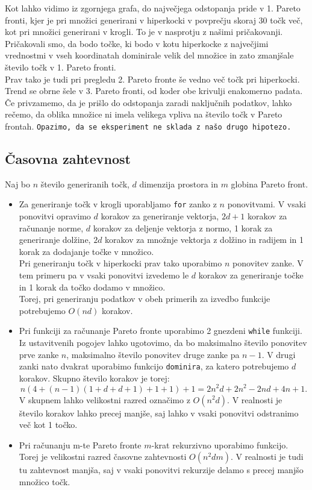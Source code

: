 \documentclass{article}
\begin{document}
Kot lahko vidimo iz zgornjega grafa, do največjega odstopanja pride v 1. Pareto fronti, kjer je pri množici generirani v hiperkocki v povprečju skoraj 30 točk več, kot pri množici generirani v krogli. To je v nasprotju z našimi pričakovanji. Pričakovali smo, da bodo točke, ki bodo v kotu hiperkocke z največjimi vrednostmi v vseh koordinatah dominirale velik del množice in zato zmanjšale število točk v 1. Pareto fronti. \\
Prav tako je tudi pri pregledu 2. Pareto fronte še vedno več točk pri hiperkocki. Trend se obrne šele v 3. Pareto fronti, od koder obe krivulji enakomerno padata. \\
Če privzamemo, da je prišlo do odstopanja zaradi naključnih podatkov, lahko rečemo, da oblika množice ni imela velikega vpliva na število točk v Pareto frontah.
\texttt{Opazimo, da se eksperiment ne sklada z našo drugo hipotezo.}

\subsection{Časovna zahtevnost}
Naj bo $n$ število generiranih točk, $d$ dimenzija prostora in $m$ globina Pareto front. 
\begin{itemize}
    \item Za generiranje točk v krogli uporabljamo \texttt{for} zanko z $n$ ponovitvami. V vsaki ponovitvi opravimo $d$ korakov za generiranje vektorja, $2d + 1$ korakov za računanje norme, $d$ korakov za deljenje vektorja z normo, 1 korak za generiranje dolžine, $2d$ korakov za množnje vektorja z dolžino in radijem in  1 korak za dodajanje točke v množico. \\
    Pri generiranju točk v hiperkocki prav tako uporabimo $n$ ponovitev zanke. V tem primeru pa v vsaki ponovitvi izvedemo le $d$ korakov za generiranje točke in 1 korak da točko dodamo v množico. \\
    Torej, pri generiranju podatkov v obeh primerih za izvedbo funkcije potrebujemo $O(nd)$ korakov. 
    \item Pri funkciji za računanje Pareto fronte uporabimo 2 gnezdeni \texttt{while} funkciji. Iz ustavitvenih pogojev lahko ugotovimo, da bo maksimalno število ponovitev prve zanke $n$, maksimalno število ponovitev druge zanke pa $n-1$. V drugi zanki nato dvakrat uporabimo funkcijo \texttt{dominira}, za katero potrebujemo $d$ korakov. Skupno število korakov je torej:
    $$
        n (4 + (n-1) (1 + d + d + 1) + 1 + 1) + 1 = 
        2n^2d + 2n^2 - 2nd + 4n + 1.
    $$
    V skupnem lahko velikostni razred označimo z $O(n^2d)$. V realnosti je število korakov lahko precej manjše, saj lahko v vsaki ponovitvi odstranimo več kot 1 točko.
    \item Pri računanju m-te Pareto fronte $m$-krat rekurzivno uporabimo funkcijo. Torej je velikostni razred časovne zahtevnosti $O(n^2dm)$. V realnosti je tudi tu zahtevnost manjša, saj v vsaki ponovitvi rekurzije delamo s precej manjšo množico točk.
\end{itemize}
 
\end{document}
